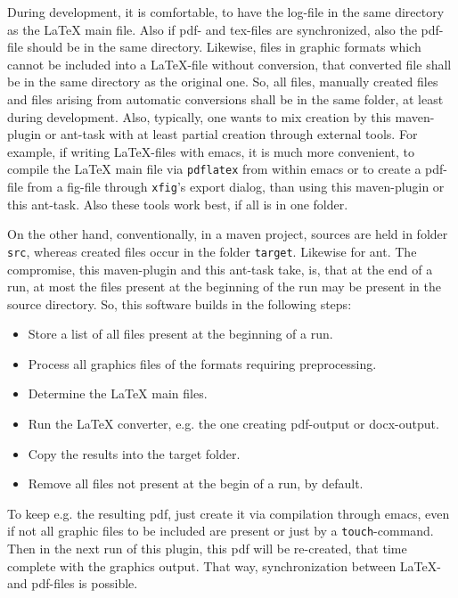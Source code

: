 \documentclass[12pt]{book}
\newcommand{\gls}[1]{#1}
\begin{document}
During development, it is comfortable, 
to have the log-file in the same directory as the \LaTeX{} main file. 
Also if pdf- and tex-files are synchronized, 
also the pdf-file should be in the same directory. 
Likewise, files in graphic formats 
which cannot be included into a \LaTeX-file without conversion, 
that converted file shall be in the same directory as the original one. 
So, all files, manually created files 
and files arising from automatic conversions 
shall be in the same folder, at least during development. 
Also, typically, one wants to mix creation by this maven-plugin or ant-task 
with at least partial creation through external tools. 
For example, if writing \LaTeX-files with emacs, 
it is much more convenient, to compile the \LaTeX{} main file 
via \texttt{pdflatex} from within emacs 
or to create a pdf-file from a \gls{fig}-file 
through \texttt{xfig}'s export dialog, 
than using this maven-plugin or this ant-task. 
Also these tools work best, if all is in one folder. 

On the other hand, 
conventionally, in a maven project, 
sources are held in folder \texttt{src}, 
whereas created files occur in the folder \texttt{target}. 
Likewise for ant. 
The compromise, this maven-plugin and this ant-task take, 
is, that at the end of a run, 
at most the files present at the beginning of the run 
may be present in the source directory. 
So, this software builds in the following steps: 
%
\begin{itemize}
\item
Store a list of all files present at the beginning of a run.
\item
Process all graphics files of the formats requiring preprocessing.
\item
Determine the \LaTeX{} main files.
\item
Run the \LaTeX{} converter, e.g. the one creating pdf-output or docx-output.
\item
Copy the results into the target folder.
\item
Remove all files not present at the begin of a run, by default. 
\end{itemize}

To keep e.g. the resulting pdf, 
just create it via compilation through emacs, 
even if not all graphic files to be included are present 
or just by a \texttt{touch}-command. 
Then in the next run of this plugin, 
this pdf will be re-created, 
that time complete with the graphics output. 
That way, synchronization between \LaTeX- and pdf-files is possible. 
\end{document}
